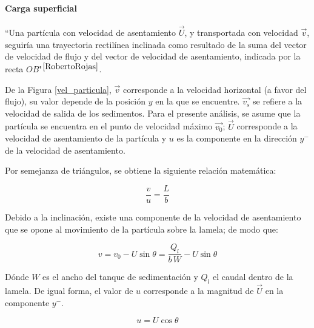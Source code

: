 \paragraph{Carga superficial} \label{carga}

\noindent
\justify

``Una part\'icula con velocidad de asentamiento $\vec{U}$, y transportada con velocidad $\vec{v}$, seguir\'ia una trayectoria rectil\'inea inclinada como resultado de la suma del vector de velocidad de flujo y del vector de velocidad de asentamiento, indicada por la recta $OB$"$^{\cite{RobertoRojas}}$.



\noindent
\justify

De la Figura \ref{vel_particula}, $\vec{v}$ corresponde a la velocidad horizontal (a favor del flujo), su valor depende de la posici\'on $y$ en la que se encuentre. $\vec{v_s}$ se refiere a la velocidad de salida de los sedimentos. Para el presente an\'alisis, se asume que la part\'icula se encuentra en el punto de velocidad m\'aximo $\vec{v_0}$; $\vec{U}$ corresponde a la velocidad de asentamiento de la part\'icula y $u$ es la componente en la direcci\'on $y^{-}$ de la velocidad de asentamiento.

\noindent
\justify

Por semejanza de tri\'angulos, se obtiene la siguiente relaci\'on matem\'atica:

\begin{equation}
	\frac{v}{u} = \frac{L}{b}
	\label{triS}
\end{equation}

\noindent
\justify

Debido a la inclinaci\'on, existe una componente de la velocidad de asentamiento que se opone al movimiento de la part\'icula sobre la lamela; de modo que:

\begin{equation}
	v = v_0 - U \sin \theta = \frac{Q _l}{b \, W} - U \sin \theta
	\label{v}
\end{equation}

\noindent
\justify

D\'onde $W$ es el ancho del tanque de sedimentaci\'on y $Q_l$ el caudal dentro de la lamela. De igual forma, el valor de $u$ corresponde a la magnitud de $\vec{U}$ en la componente $y^{-}$.

\begin{equation}
	u = U \cos \theta
	\label{u}
\end{equation}

